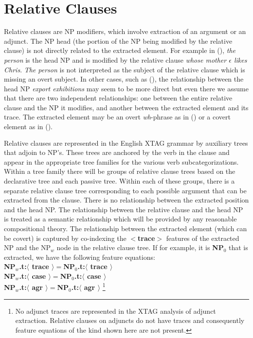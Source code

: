 \chapter{Relative Clauses}
\label{rel_clauses}

Relative clauses are NP modifiers, which involve extraction of
an argument or an adjunct. The NP head (the
portion of the NP being modified by the relative clause) is 
not directly related to the extracted element. 
For example in (), {\it the person} is the head NP
and is modified by the relative clause {\it whose mother $\epsilon$ 
likes Chris}. {\em The person} is not interpreted as the subject of the
relative clause which is missing an overt subject. In other cases, such
as (), the relationship between the head NP {\em export exhibitions}
may seem to be more direct but even there we assume that there are two
independent relationships: one between the entire relative clause
and the NP it modifies, and another between the extracted element
and its trace. The extracted element may be an overt {\em wh}-phrase
as in () or a covert element as in (). 


Relative clauses are represented in the English XTAG grammar by auxiliary trees
that adjoin to NP's. These trees are anchored by the verb in the clause and
appear in the appropriate tree families for the various verb
subcategorizations. Within a tree family there will be groups of relative
clause trees based on the declarative tree and each passive tree. Within each
of these groups, there is a separate relative clause tree corresponding to each
possible argument that can be extracted from the clause. There is
no  relationship between the extracted position and the head NP.
The relationship between the relative clause and the head NP is treated
as a semantic relationship which will be provided by any reasonable
compositional theory. The relationship between the extracted element
(which can be covert) is captured by co-indexing the
{\bf $<$trace$>$} features of the extracted NP and the NP$_{w}$ node in the
relative clause tree. If for example, it is {\bf NP$_{0}$} that is extracted,
we have the following feature equations:\\
{\bf NP$_{w}$.t:$\langle$ trace $\rangle =$NP$_{0}$.t:$\langle$ trace $\rangle$}\\
{\bf NP$_{w}$.t:$\langle$ case $\rangle =$NP$_{0}$.t:$\langle$ case $\rangle$}\\
{\bf NP$_{w}$.t:$\langle$ agr $\rangle =$NP$_{0}$.t:$\langle$ agr $\rangle$}
\footnote{
No adjunct traces are represented in the XTAG analysis of adjunct extraction.
Relative clauses on adjuncts do not have traces and consequently feature
equations of the kind shown here are not present.}

